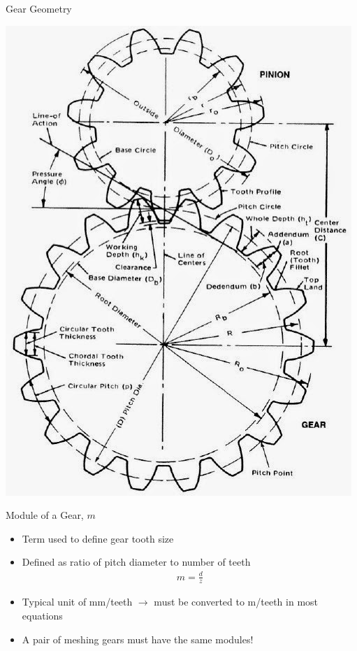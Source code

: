 \documentclass[10pt, svgnames]{beamer}
\begin{document}
\begin{frame}[label={sec:orgb274fdb}]{Gear Geometry}
\begin{center}
\includegraphics[width=.9\linewidth]{pictures/gear-pair.jpg}
\end{center}

Module of a Gear, \(m\)

\begin{itemize}
\item Term used to define gear tooth size

\item Defined as ratio of pitch diameter to number of teeth
\begin{align*}
  m = \frac{d}{z}
\end{align*}

\item Typical unit of mm/teeth \(\rightarrow\) must be converted to m/teeth
in most equations

\item A pair of meshing gears must have the same modules!
\end{itemize}
\end{frame}
\end{document}
